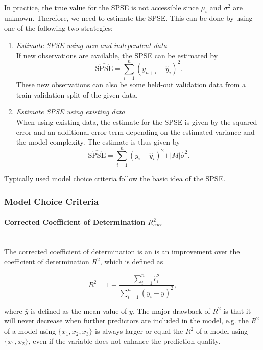 \documentclass[10pt,a4paper]{article}
\newcommand{\subsubsubsection}[1]{\paragraph{#1}\mbox{}\\}
\begin{document}

In practice, the true value for the SPSE is not accessible since $\mu_i$ and $\sigma^2$ are unknown. Therefore, we need to estimate the SPSE. This can be done by using one of the following two strategies:

\begin{enumerate}

	\item \emph{Estimate SPSE using new and independent data} \\	
	If new observations are available, the SPSE can be estimated by
	$$\widehat{\text{SPSE}} = \sum_{i=1}^n (y_{n+i} - \hat y_i)^2.$$
	These new observations can also be some held-out validation data from a train-validation split of the given data. 
	
	\item \emph{Estimate SPSE using existing data} \\
	When using existing data, the estimate for the SPSE is given by the squared error and an additional error term depending on the estimated variance and the model complexity. The estimate is thus given by
	$$\widehat{\text{SPSE}} = \sum_{i=1}^n(y_i - \hat y_i)^2 + \vert M \vert \hat \sigma^2.$$
\end{enumerate}

Typically used model choice criteria follow the basic idea of the SPSE.

\subsubsection{Model Choice Criteria}

\subsubsubsection{Corrected Coefficient of Determination $R^2_{corr}$}

The corrected coefficient of determination is an is an improvement over the coefficient of determination $R^2$, which is defined as 

$$R^2 = 1 - \frac{\sum_{i=1}^n \hat \epsilon_i^2}{\sum_{i=1}^n (y_i - \bar y)^2},$$

where $\bar y$ is defined as the mean value of $y$. The major drawback of $R^2$ is that it will never decrease when further predictors are included in the model, e.g. the $R^2$ of a model using $\{x_1, x_2, x_3\}$ is always larger or equal the $R^2$ of a model using $\{x_1, x_2\}$, even if the variable does not enhance the prediction quality. 
\end{document}
